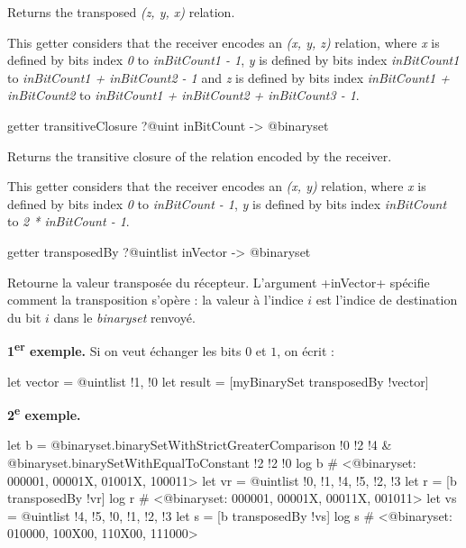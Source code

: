 Returns the transposed \emph{(z, y, x)} relation.

This getter considers that the receiver encodes an \emph{(x, y, z)} relation, where \emph{x} is defined by bits index \emph{0} to \emph{inBitCount1  - 1}, \emph{y} is defined by bits index \emph{inBitCount1} to \emph{inBitCount1 + inBitCount2 - 1} and  \emph{z} is defined by bits index \emph{inBitCount1 + inBitCount2} to \emph{inBitCount1 + inBitCount2 + inBitCount3 - 1}.









\begin{galgasbox}
getter transitiveClosure ?@uint inBitCount -> @binaryset
\end{galgasbox}


Returns the transitive closure of the relation encoded by the receiver.

This getter considers that the receiver encodes an \emph{(x, y)} relation, where \emph{x} is defined by bits index \emph{0} to \emph{inBitCount  - 1}, \emph{y} is defined by bits index \emph{inBitCount} to \emph{2 * inBitCount - 1}.







\begin{galgasbox}
getter transposedBy ?@uintlist inVector -> @binaryset
\end{galgasbox}

Retourne la valeur transposée du récepteur. L'argument \ggs+inVector+ spécifie comment la transposition s'opère : la valeur à l'indice $i$ est l'indice de destination du bit $i$ dans le \emph{binaryset} renvoyé.

{\bf 1\textsuperscript{er} exemple.} Si on veut échanger les bits $0$ et $1$, on écrit :
\begin{galgas}
let vector = @uintlist {!1, !0}
let result = [myBinarySet transposedBy !vector]
\end{galgas}

{\bf 2\textsuperscript{e} exemple.}
\begin{galgas}
  let b = @binaryset.binarySetWithStrictGreaterComparison {!0 !2 !4}
    & @binaryset.binarySetWithEqualToConstant {!2 !2 !0}
  log b # <@binaryset: 000001, 00001X, 01001X, 100011>
  let vr = @uintlist {!0, !1, !4, !5, !2, !3}
  let r = [b transposedBy !vr]
  log r # <@binaryset: 000001, 00001X, 00011X, 001011>
  let vs = @uintlist {!4, !5, !0, !1, !2, !3}
  let s = [b transposedBy !vs]
  log s # <@binaryset: 010000, 100X00, 110X00, 111000>
\end{galgas}

